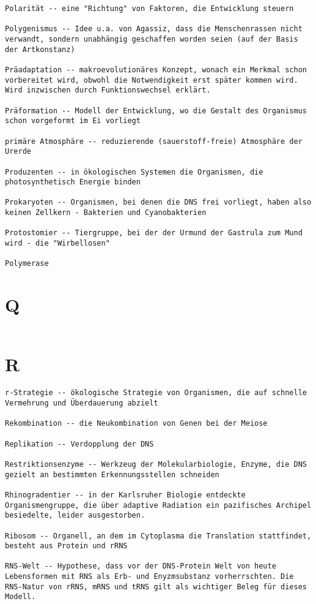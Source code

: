 \documentclass{article}
\begin{document}
\begin{verbatim}
Polarität -- eine "Richtung" von Faktoren, die Entwicklung steuern

Polygenismus -- Idee u.a. von Agassiz, dass die Menschenrassen nicht verwandt, sondern unabhängig geschaffen worden seien (auf der Basis der Artkonstanz)

Präadaptation -- makroevolutionäres Konzept, wonach ein Merkmal schon vorbereitet wird, obwohl die Notwendigkeit erst später kommen wird. Wird inzwischen durch Funktionswechsel erklärt.

Präformation -- Modell der Entwicklung, wo die Gestalt des Organismus schon vorgeformt im Ei vorliegt

primäre Atmosphäre -- reduzierende (sauerstoff-freie) Atmosphäre der Urerde

Produzenten -- in ökologischen Systemen die Organismen, die photosynthetisch Energie binden

Prokaryoten -- Organismen, bei denen die DNS frei vorliegt, haben also keinen Zellkern - Bakterien und Cyanobakterien

Protostomier -- Tiergruppe, bei der der Urmund der Gastrula zum Mund wird - die "Wirbellosen"

Polymerase
\end{verbatim}
\newpage


\section{Q}
\begin{verbatim}

\end{verbatim}
\newpage


\section{R}
\begin{verbatim}
r-Strategie -- ökologische Strategie von Organismen, die auf schnelle Vermehrung und Überdauerung abzielt

Rekombination -- die Neukombination von Genen bei der Meiose

Replikation -- Verdopplung der DNS

Restriktionsenzyme -- Werkzeug der Molekularbiologie, Enzyme, die DNS gezielt an bestimmten Erkennungsstellen schneiden

Rhinogradentier -- in der Karlsruher Biologie entdeckte Organismengruppe, die über adaptive Radiation ein pazifisches Archipel besiedelte, leider ausgestorben.

Ribosom -- Organell, an dem im Cytoplasma die Translation stattfindet, besteht aus Protein und rRNS

RNS-Welt -- Hypothese, dass vor der DNS-Protein Welt von heute Lebensformen mit RNS als Erb- und Enyzmsubstanz vorherrschten. Die RNS-Natur von rRNS, mRNS und tRNS gilt als wichtiger Beleg für dieses Modell.
\end{verbatim}
\newpage
\end{document}
